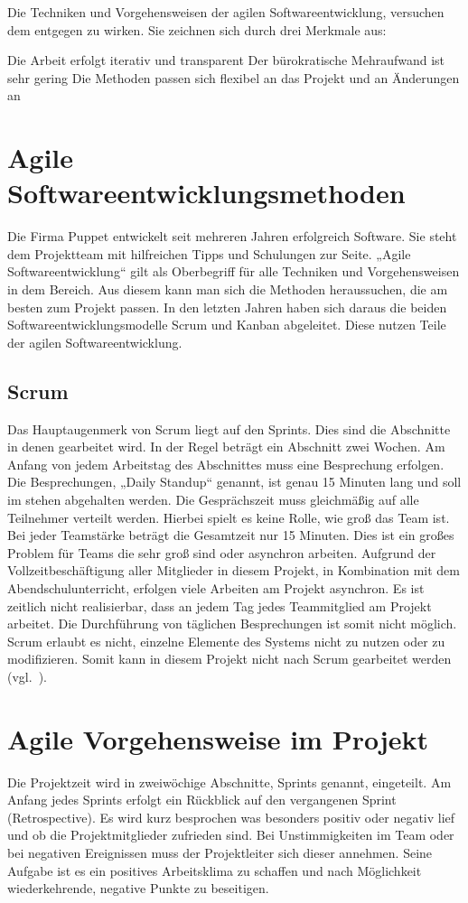 Die Techniken und Vorgehensweisen der agilen Softwareentwicklung, versuchen dem
entgegen zu wirken. Sie zeichnen sich durch drei Merkmale aus:

\begin{outline}
  \1 Die Arbeit erfolgt iterativ und transparent
  \1 Der bürokratische Mehraufwand ist sehr gering
  \1 Die Methoden passen sich flexibel an das Projekt und an Änderungen an
\end{outline}
\tm%

\section{Agile Softwareentwicklungsmethoden}
Die Firma Puppet entwickelt seit mehreren Jahren erfolgreich Software. Sie
steht dem Projektteam mit hilfreichen Tipps und Schulungen zur Seite. „Agile
Softwareentwicklung“ gilt als Oberbegriff für alle Techniken und
Vorgehensweisen in dem Bereich. Aus diesem kann man sich die Methoden
heraussuchen, die am besten zum Projekt passen. In den letzten Jahren haben
sich daraus die beiden Softwareentwicklungsmodelle Scrum und Kanban abgeleitet.
Diese nutzen Teile der agilen Softwareentwicklung.
\tm%

\subsection{Scrum}
Das Hauptaugenmerk von Scrum liegt auf den Sprints. Dies sind die Abschnitte in
denen gearbeitet wird. In der Regel beträgt ein Abschnitt zwei Wochen. Am
Anfang von jedem Arbeitstag des Abschnittes muss eine Besprechung erfolgen. Die
Besprechungen, „Daily Standup“ genannt, ist genau 15 Minuten lang und soll im
stehen abgehalten werden. Die Gesprächszeit muss gleichmäßig auf alle
Teilnehmer verteilt werden. Hierbei spielt es keine Rolle, wie groß das Team
ist. Bei jeder Teamstärke beträgt die Gesamtzeit nur 15 Minuten. Dies ist ein
großes Problem für Teams die sehr groß sind oder asynchron arbeiten. Aufgrund
der Vollzeitbeschäftigung aller Mitglieder in diesem Projekt, in Kombination
mit dem Abendschulunterricht, erfolgen viele Arbeiten am Projekt asynchron. Es
ist zeitlich nicht realisierbar, dass an jedem Tag jedes Teammitglied am
Projekt arbeitet. Die Durchführung von täglichen Besprechungen ist somit nicht
möglich. Scrum erlaubt es nicht, einzelne Elemente des Systems nicht zu nutzen
oder zu modifizieren. Somit kann in diesem Projekt nicht nach Scrum gearbeitet
werden (vgl.~\cite{scrum_talk}).
\tm%

\section{Agile Vorgehensweise im Projekt}
\label{sec:agile_vorgehensweise}
Die Projektzeit wird in zweiwöchige Abschnitte, Sprints genannt, eingeteilt. Am
Anfang jedes Sprints erfolgt ein Rückblick auf den vergangenen Sprint
(Retrospective). Es wird kurz besprochen was besonders positiv oder negativ
lief und ob die Projektmitglieder zufrieden sind. Bei Unstimmigkeiten im Team
oder bei negativen Ereignissen muss der Projektleiter sich dieser annehmen.
Seine Aufgabe ist es ein positives Arbeitsklima zu schaffen und nach
Möglichkeit wiederkehrende, negative Punkte zu beseitigen.

